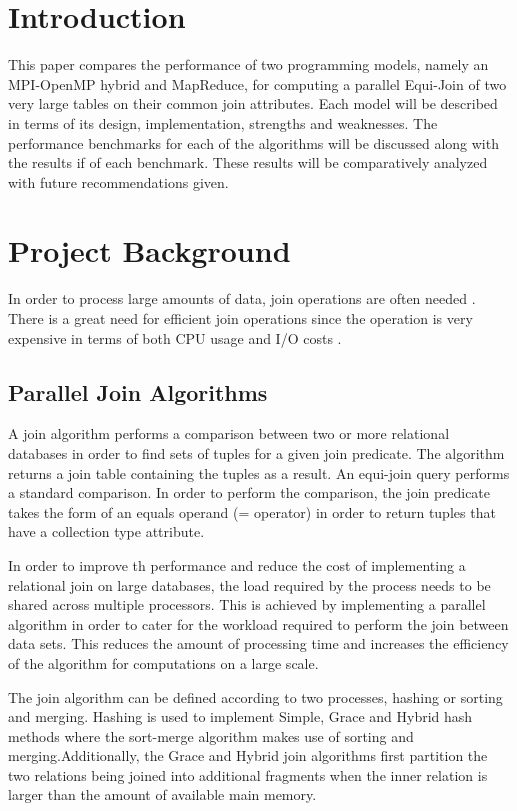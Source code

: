 \documentclass[10pt,twocolumn]{witseiepaper}
\begin{document}
\section{Introduction}

This paper compares the performance of two programming models, namely an MPI-OpenMP hybrid and MapReduce, for computing a parallel Equi-Join of two very large tables on their common join attributes. Each model will be described in terms of its design, implementation, strengths and weaknesses. The performance benchmarks for each of the algorithms will be discussed along with the results if of each benchmark. These results will be comparatively analyzed with future recommendations given.

\section{Project Background}
In order to process large amounts of data, join operations are often needed \cite{mapReduceJoin}. There is a great need for efficient join operations since the operation is very expensive in terms of both CPU usage and I/O costs \cite{mapReduceJoin}.
 
\subsection{Parallel Join Algorithms}

A join algorithm performs a comparison between two or more relational databases in order to find sets of tuples for a given join predicate. The algorithm returns a join table containing the tuples as a result. An equi-join query performs a standard comparison. In order to perform the comparison, the join predicate takes the form of an equals operand (= operator) in order to return tuples that have a collection type attribute\cite{joinalg}.

In order to improve th performance and reduce the cost of implementing a relational join on large databases, the load required by the process needs to be shared across multiple processors. This is achieved by implementing a parallel algorithm in order to cater for the workload required to perform the join between data sets. This reduces the amount of processing time and increases the efficiency of the algorithm for computations on a large scale.

The join algorithm can be defined according to two processes, hashing or sorting and merging. Hashing is used to implement Simple, Grace and Hybrid hash methods where the sort-merge algorithm makes use of sorting and merging.Additionally, the Grace and Hybrid join algorithms first partition the two relations being joined into additional fragments when the inner relation is larger than the amount of available main memory.
\end{document}
